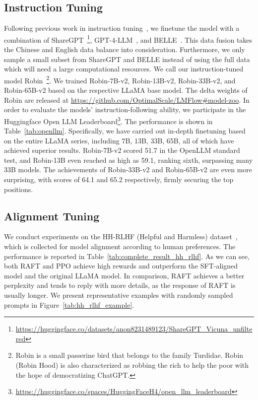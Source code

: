 \documentclass[11pt]{article}
\begin{document}
\subsection{Instruction Tuning}
Following previous work in instruction tuning~\citep{wang2022self, alpaca, zheng2023judging}, we finetune the model with a combination of ShareGPT~\footnote{\url{https://huggingface.co/datasets/anon8231489123/ShareGPT_Vicuna_unfiltered}}, GPT-4-LLM~\citep{peng2023instruction}, and BELLE~\citep{BELLE, belle2023exploring}.
This data fusion takes the Chinese and English data balance into consideration.
Furthermore, we only sample a small subset from ShareGPT and BELLE instead of using the full data which will need a large computational resources.
We call our instruction-tuned model Robin~\footnote{Robin is a small passerine bird that belongs to the family Turdidae. Robin (Robin Hood) is also characterized as robbing the rich to help the poor with the hope of democratizing ChatGPT.}.
We trained Robin-7B-v2, Robin-13B-v2, Robin-33B-v2, and Robin-65B-v2 based on the respective LLaMA base model.
The delta weights of Robin are released at \url{https://github.com/OptimalScale/LMFlow#model-zoo}.
In order to evaluate the models’ instruction-following ability, we participate in the Huggingface Open LLM Leaderboard\footnote{\url{https://huggingface.co/spaces/HuggingFaceH4/open_llm_leaderboard}}.
The performance is shown in Table~\ref{tab:openllm}.
Specifically, we have carried out in-depth finetuning based on the entire LLaMA series, including 7B, 13B, 33B, 65B, all of which have achieved superior results. 
Robin-7B-v2 scored 51.7 in the OpenLLM standard test, and Robin-13B even reached as high as 59.1, ranking sixth, surpassing many 33B models. 
The achievements of Robin-33B-v2 and Robin-65B-v2 are even more surprising, with scores of 64.1 and 65.2 respectively, firmly securing the top positions.



\subsection{Alignment Tuning}
We conduct experiments on the HH-RLHF (Helpful and Harmless) dataset~\citep{bai2022training}, which is collected for model alignment according to human preferences. 
The performance is reported in Table~\ref{tab:complete_result_hh_rlhf}. 
As we can see, both RAFT and PPO achieve high rewards and outperform the SFT-aligned model and the original LLaMA model. 
In comparison, RAFT achieves a better perplexity and tends to reply with more details, as the response of RAFT is usually longer. 
We present representative examples with randomly sampled prompts in Figure~\ref{tab:hh_rlhf_example}. 
\end{document}
